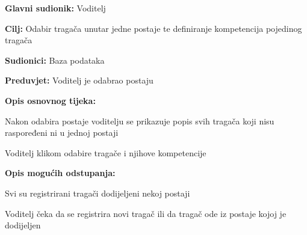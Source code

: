 					\noindent {}
					\begin{packed_item}
						
						\item \textbf{Glavni sudionik: } Voditelj
						\item  \textbf{Cilj:} Odabir tragača unutar jedne postaje te definiranje kompetencija pojedinog tragača
						\item  \textbf{Sudionici:} Baza podataka
						\item  \textbf{Preduvjet:} Voditelj je odabrao postaju
						\item  \textbf{Opis osnovnog tijeka:}
						
						\item[] \begin{packed_enum}
							
							\item Nakon odabira postaje voditelju se prikazuje popis svih tragača koji nisu raspoređeni ni u jednoj postaji
							\item Voditelj klikom odabire tragače i njihove kompetencije
						\end{packed_enum}
						
						\item  \textbf{Opis mogućih odstupanja:}
						
						\item[] \begin{packed_item}
							
							\item[2.a] Svi su registrirani tragači dodijeljeni nekoj postaji 
							\item[] \begin{packed_enum}
								
								\item  Voditelj čeka da se registrira novi tragač ili da tragač ode iz postaje kojoj je dodijeljen
								
								
							\end{packed_enum}
						
							
						\end{packed_item}
					\end{packed_item}
					
